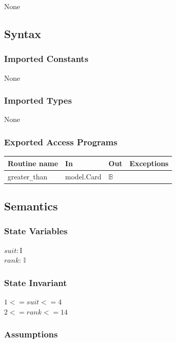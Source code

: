 \documentclass[12pt, titlepage]{article}
\begin{document}
None

\subsection* {Syntax}

\subsubsection* {Imported Constants}

None

\subsubsection* {Imported Types}

None

\subsubsection* {Exported Access Programs}

\begin{tabular}{| l | l | l | p{5cm} |}
\hline
\textbf{Routine name} & \textbf{In} & \textbf{Out} & \textbf{Exceptions}\\
\hline
greater\verb|_|than & model.Card & $\mathbb{B}$ &\\
\hline
\end{tabular}

\subsection* {Semantics}

\subsubsection* {State Variables}

$\mathit{suit}: \text{I}$\\
$\mathit{rank}$: $\mathbb{I}$

\subsubsection* {State Invariant}

$1 <= \mathit{suit} <= 4$\\
$2 <= \mathit{rank} <= 14$

\subsubsection* {Assumptions}
\end{document}
